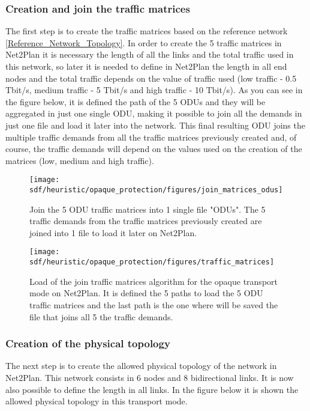 \newpage
\subsubsection{Creation and join the traffic matrices}

\noindent
The first step is to create the traffic matrices based on the reference network \ref{Reference_Network_Topology}. In order to create the 5 traffic matrices in Net2Plan it is necessary the length of all the links and the total traffic used in this network, so later it is needed to define in Net2Plan the length in all end nodes and the total traffic depends on the value of traffic used (low traffic - 0.5 Tbit/s, medium traffic - 5 Tbit/s and high traffic - 10 Tbit/s). As you can see in the figure below, it is defined the path of the 5 ODUs and they will be aggregated in just one single ODU, making it possible to join all the demands in just one file and load it later into the network. This final resulting ODU joins the multiple traffic demands from all the traffic matrices previously created and, of course, the traffic demands will depend on the values used on the creation of the matrices (low, medium and high traffic).

\begin{figure}[H]
\centering
\texttt{[image: sdf/heuristic/opaque\_protection/figures/join\_matrices\_odus]}
\caption{Join the 5 ODU traffic matrices into 1 single file "ODUs". The 5 traffic demands from the traffic matrices previously created are joined into 1 file to load it later on Net2Plan.}
\label{join_matrices_odus}
\end{figure}

\begin{figure}[H]
\centering
\texttt{[image: sdf/heuristic/opaque\_protection/figures/traffic\_matrices]}
\caption{Load of the join traffic matrices algorithm for the opaque transport mode on Net2Plan. It is defined the 5 paths to load the 5 ODU traffic matrices and the last path is the one where will be saved the file that joins all 5 the traffic demands.}
\label{traffic_matrices_surv_ref}
\end{figure}

\newpage
\subsubsection{Creation of the physical topology}

\vspace{11pt}
The next step is to create the allowed physical topology of the network in Net2Plan. This network consists in 6 nodes and 8 bidirectional links. It is now also possible to define the length in all links. In the figure below it is shown the allowed physical topology in this transport mode.

